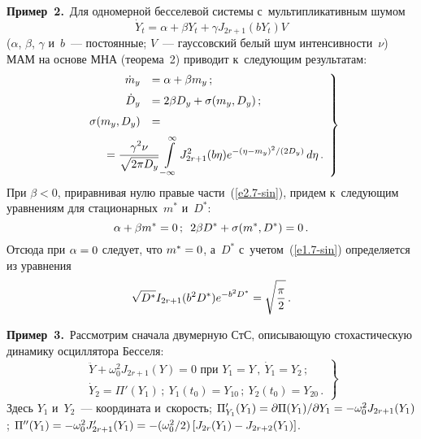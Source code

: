 \begin{multicols}{2}
{\noindent
\textbf{Пример~2.}\
Для одномерной бесселевой системы с~мультипликативным шумом
\begin{equation*}
\dot Y_t = \alpha + \beta Y_t + \gamma J_{2r+1} (bY_t) V %
\end{equation*}
($\alpha$, $\beta$, $\gamma$ и~$b$~--- постоянные; 
$V$~--- гауссовский белый шум интенсивности~$\nu$) МАМ на основе МНА (теорема~2) 
приводит к~следующим результатам:
\begin{equation}
\left.
\begin{array}{rl}
    \dot m_y &= \alpha+\beta m_y\,;\\[6pt]
    \dot D_y &= 2 \beta D_y + \si(m_y, D_y)\,;
\\[6pt]
    \si(m_y, D_y) &= {}\\[6pt]
    &\hspace*{-15mm}{}=\fr{\gamma^2 \nu}{\sqrt{2\pi D_y}} 
   \displaystyle \iin J_{2r+1}^2 (b\eta) e^{-(\eta- m_y)^2/(2D_y)}\, d\eta\,.
    \end{array}
    \right\}
    \label{e2.7-sin}
    \end{equation}
При $\beta<0$, приравнивая нулю правые части~(\ref{e2.7-sin}), придем 
к~следующим уравнениям для стационарных~$m^*$ и~$D^*$:
\begin{equation*}
\alpha+\beta m^*=0\,;\enskip 2\beta D^* +\sigma(m^*, D^*) =0\,.
\end{equation*}
Отсюда при  $\alpha\hm=0$ следует, что  $m^*\hm=0$,  а~$D^*$ с~учетом~(\ref{e1.7-sin}) 
определяется из уравнения
\begin{equation*}
\sqrt{D^*} I_{2r+1}(b^2 D^*) e^{-b^2D^*} = \sqrt{\displaystyle\frac{\displaystyle \pi\mathstrut}{\displaystyle 2\mathstrut}}\,. 
\end{equation*}

\noindent
\textbf{Пример~3.}\
Рассмотрим сначала двумерную СтС, описывающую стохастическую динамику осциллятора 
Бесселя:
\begin{equation*}
\left.
\begin{array}{c}
\ddot Y +\omega_0^2 J_{2r+1} (Y)=0 \mbox{ при }
    Y_1=Y\,,\ \dot Y_1 = Y_2\,; \\[6pt]
     \dot Y_2 = \Pi' (Y_1)\,; \ Y_1(t_0) = Y_{10}\,;\ 
     Y_2(t_0) = Y_{20}\,.
     \end{array}
     \right\}
     \end{equation*}
Здесь $Y_1$ и~$Y_2$~--- координата и~скорость; 
$\Pi_{Y_1}' (Y_1) \hm= \prt  \Pi (Y_1)/ \prt Y_1\hm= -\omega_0^2 J_{2r+1} (Y_1)$;
$\Pi'' (Y_1) \hm=- \omega_0^2 J_{2r+1}'(Y_1) \hm= - (\omega_0^2/2) \lk J_{2r} (Y_1) \hm- 
J_{2r+2}(Y_1)\rk$.

}
\end{multicols}
